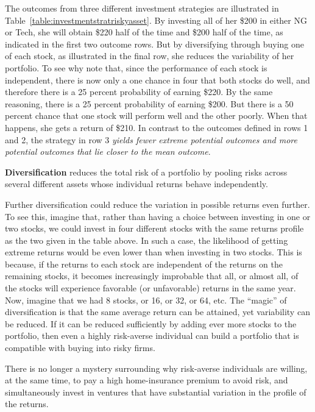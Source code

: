 The outcomes from three different investment strategies are illustrated in
Table~\ref{table:investmentstratriskyasset}. By investing all of her \$200
in either NG or Tech, she will obtain \$220 half of the time and \$200 half
of the time, as indicated in the first two outcome rows. But by diversifying
through buying one of each stock, as illustrated in the final row, she
reduces the variability of her portfolio. To see why note that, since the
performance of each stock is independent, there is now only a one chance in
four that both stocks do well, and therefore there is a 25 percent
probability of earning \$220. By the same reasoning, there is a 25 percent
probability of earning \$200. But there is a 50 percent chance that one
stock will perform well and the other poorly. When that happens, she gets a
return of \$210. In contrast to the outcomes defined in rows 1 and 2, the 
 strategy in row 3 \textit{yields fewer extreme
potential outcomes and more potential outcomes that lie closer to the mean
outcome}.

\newhtmlpage

\begin{DefBox}
\textbf{Diversification} reduces the total risk of a portfolio by pooling risks across several different assets whose individual returns behave independently.
\end{DefBox}

Further diversification could reduce the variation in possible returns even
further. To see this, imagine that, rather than having a choice between
investing in one or two stocks, we could invest in four different stocks
with the same returns profile as the two given in the table above. In such a
case, the likelihood of getting extreme returns would be even lower than
when investing in two stocks. This is because, if the returns to each stock
are independent of the returns on the remaining stocks, it becomes
increasingly improbable that all, or almost all, of the stocks will
experience favorable (or unfavorable) returns in the same year. Now, imagine
that we had 8 stocks, or 16, or 32, or 64, etc. The ``magic''
of diversification is that the same average return
can be attained, yet variability can be reduced. If it can be reduced
sufficiently by adding ever more stocks to the portfolio, then even a highly
risk-averse individual can build a portfolio that is compatible with buying
into risky firms.

There is no longer a mystery surrounding why risk-averse individuals are
willing, at the same time, to pay a high home-insurance premium to avoid
risk, and simultaneously invest in ventures that have substantial variation
in the profile of the returns.

